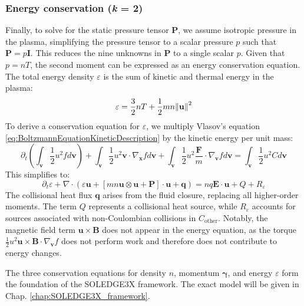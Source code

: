 \subsubsection{Energy conservation (\textit{k} = 2)}
\label{ssec:desc_energyBalance}
Finally, to solve for the static pressure tensor $\boldsymbol{P}$, we assume isotropic pressure in the plasma, simplifying the pressure tensor to a scalar pressure $p$ such that $\boldsymbol{P} = p \boldsymbol{I}$. This reduces the nine unknowns in $\boldsymbol{P}$ to a single scalar $p$. Given that $p = nT$, the second moment can be expressed as an energy conservation equation. The total energy density $\varepsilon$ is the sum of kinetic and thermal energy in the plasma:
\begin{equation}
	\varepsilon = \frac{3}{2} nT + \frac{1}{2} mn \norm{\mathbf{u}}^2
\end{equation}
To derive a conservation equation for $\varepsilon$, we multiply Vlasov's equation \ref{eq:BoltzmannEquationKineticDescription} by the kinetic energy per unit mass:
\begin{equation}
	\partial_t \left( \int_\mathbf{v} \frac{1}{2} u^2 f d\mathbf{v} \right) + \int_\mathbf{v} \frac{1}{2} u^2 \mathbf{v} \cdot \nabla_{\mathbf{x}} f d\mathbf{v} + \int_\mathbf{v} \frac{1}{2} u^2 \frac{\mathbf{F}}{m} \cdot \nabla_{\mathbf{v}} f d\mathbf{v} = \int_\mathbf{v} \frac{1}{2} u^2 C d\mathbf{v}
\end{equation}
This simplifies to:
\begin{equation}
	\label{eq:SecondMomentTransportEquation}
	\partial_t \varepsilon + \nabla \cdot \left( \varepsilon \mathbf{u} + \left[ mn \mathbf{u} \otimes \mathbf{u} + \boldsymbol{P} \right] \cdot \mathbf{u} + \mathbf{q} \right) = nq \mathbf{E} \cdot \mathbf{u} + Q + R_\varepsilon
\end{equation}
The collisional heat flux $\mathbf{q}$ arises from the fluid closure, replacing all higher-order moments. The term $Q$ represents a collisional heat source, while $R_\varepsilon$ accounts for sources associated with non-Coulombian collisions in $C_{\text{other}}$. Notably, the magnetic field term $\mathbf{u} \times \mathbf{B}$ does not appear in the energy equation, as the torque $\frac{1}{2} u^2 \mathbf{u} \times \mathbf{B} \cdot \nabla_{\mathbf{v}} f$ does not perform work and therefore does not contribute to energy changes. \newline

The three conservation equations for density $n$, momentum $\boldsymbol{\gamma}$, and energy $\varepsilon$ form the foundation of the SOLEDGE3X framework. The exact model will be given in Chap. \ref{chap:SOLEDGE3X_framework}.



